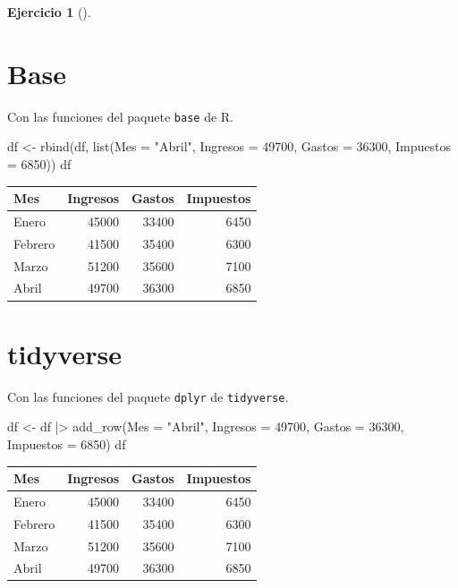 \documentclass[
  spanish,
  a4paper,
]{scrreport}
\newenvironment{Shaded}{\begin{snugshade}}{\end{snugshade}}
\newcommand{\AttributeTok}[1]{\textcolor[rgb]{0.40,0.45,0.13}{#1}}
\newcommand{\DecValTok}[1]{\textcolor[rgb]{0.68,0.00,0.00}{#1}}
\newcommand{\FunctionTok}[1]{\textcolor[rgb]{0.28,0.35,0.67}{#1}}
\newcommand{\NormalTok}[1]{\textcolor[rgb]{0.00,0.23,0.31}{#1}}
\newcommand{\OtherTok}[1]{\textcolor[rgb]{0.00,0.23,0.31}{#1}}
\newcommand{\SpecialCharTok}[1]{\textcolor[rgb]{0.37,0.37,0.37}{#1}}
\newcommand{\StringTok}[1]{\textcolor[rgb]{0.13,0.47,0.30}{#1}}
\theoremstyle{definition}
\newtheorem{exercise}{Ejercicio}[chapter]
\theoremstyle{remark}
\begin{document}
\begin{exercise}[]
\begin{enumerate}
\begin{tcolorbox}
  \section{Base}

  Con las funciones del paquete \texttt{base} de R.

\begin{Shaded}
\begin{Highlighting}[]
\NormalTok{df }\OtherTok{\textless{}{-}} \FunctionTok{rbind}\NormalTok{(df, }\FunctionTok{list}\NormalTok{(}\AttributeTok{Mes =} \StringTok{"Abril"}\NormalTok{, }\AttributeTok{Ingresos =} \DecValTok{49700}\NormalTok{, }\AttributeTok{Gastos =} \DecValTok{36300}\NormalTok{, }\AttributeTok{Impuestos =} \DecValTok{6850}\NormalTok{))}
\NormalTok{df}
\end{Highlighting}
\end{Shaded}

  \begin{longtable}[]{@{}lrrr@{}}
  \toprule\noalign{}
  Mes & Ingresos & Gastos & Impuestos \\
  \midrule\noalign{}
  \endhead
  \bottomrule\noalign{}
  \endlastfoot
  Enero & 45000 & 33400 & 6450 \\
  Febrero & 41500 & 35400 & 6300 \\
  Marzo & 51200 & 35600 & 7100 \\
  Abril & 49700 & 36300 & 6850 \\
  \end{longtable}

  \section{tidyverse}

  Con las funciones del paquete \texttt{dplyr} de \texttt{tidyverse}.

\begin{Shaded}
\begin{Highlighting}[]
\NormalTok{df }\OtherTok{\textless{}{-}}\NormalTok{ df }\SpecialCharTok{|\textgreater{}} \FunctionTok{add\_row}\NormalTok{(}\AttributeTok{Mes =} \StringTok{"Abril"}\NormalTok{, }\AttributeTok{Ingresos =} \DecValTok{49700}\NormalTok{, }\AttributeTok{Gastos =} \DecValTok{36300}\NormalTok{, }\AttributeTok{Impuestos =} \DecValTok{6850}\NormalTok{)}
\NormalTok{df}
\end{Highlighting}
\end{Shaded}

  \begin{longtable}[]{@{}lrrr@{}}
  \toprule\noalign{}
  Mes & Ingresos & Gastos & Impuestos \\
  \midrule\noalign{}
  \endhead
  \bottomrule\noalign{}
  \endlastfoot
  Enero & 45000 & 33400 & 6450 \\
  Febrero & 41500 & 35400 & 6300 \\
  Marzo & 51200 & 35600 & 7100 \\
  Abril & 49700 & 36300 & 6850 \\
  \end{longtable}


\end{tcolorbox}
\end{enumerate}
\end{exercise}
\end{document}
